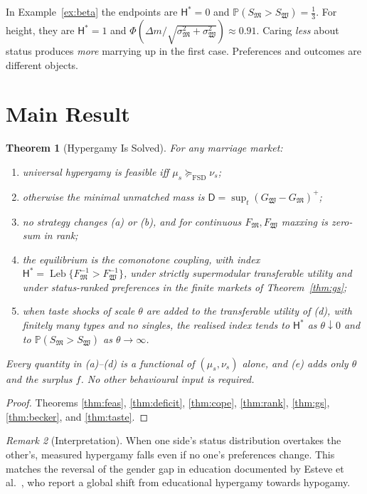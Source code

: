 \documentclass[11pt]{article}
\let\oldsection\section
\renewcommand{\section}{\Needspace{0.25\textheight}\oldsection}
\newtheorem{theorem}{Theorem}[section]
\theoremstyle{definition}
\theoremstyle{remark}
\newtheorem{remark}[theorem]{Remark}
\newcommand{\M}{\mathfrak{M}}
\newcommand{\W}{\mathfrak{W}}
\newcommand{\D}{\mathsf{D}}
\newcommand{\Hy}{\mathsf{H}}
\DeclareMathOperator{\Leb}{Leb}
\begin{document}
In Example~\ref{ex:beta} the endpoints are $\Hy^* = 0$ and
$\mathbb{P}(S_\M > S_\W) = \frac13$. For height, they are $\Hy^* = 1$
and $\Phi(\Delta m/\sqrt{\sigma_\M^2+\sigma_\W^2})\approx0.91$.
Caring \emph{less} about status produces \emph{more} marrying up in
the first case. Preferences and outcomes are different objects.

\section{Main Result}

\begin{theorem}[Hypergamy Is Solved]\label{thm:main}
  For any marriage market:
  \renewcommand{\labelenumi}{(\alph{enumi})}
  \begin{enumerate}
    \item universal hypergamy is feasible iff
      $\mu_s\succeq_{\mathrm{FSD}}\nu_s$;
    \item otherwise the minimal unmatched mass is $\D = \sup_t(G_\W - G_\M)^+$;
    \item no strategy changes (a) or (b), and for continuous
      $F_\M,F_\W$ maxxing is zero-sum in rank;
    \item the equilibrium is the comonotone coupling, with index
      ${\Hy^* = \Leb\{F_\M^{-1} > F_\W^{-1}\}}$, under strictly
      supermodular transferable utility and under status-ranked
      preferences in the finite markets of Theorem~\ref{thm:gs};
    \item when taste shocks of scale $\theta$ are added to the
      transferable utility of (d), with finitely many types and no
      singles, the realised index tends to $\Hy^*$ as
      $\theta\downarrow0$ and to $\mathbb{P}(S_\M > S_\W)$ as
      $\theta\to\infty$.
  \end{enumerate}
  Every quantity in (a)--(d) is a functional of $(\mu_s,\nu_s)$ alone,
  and (e) adds only $\theta$ and the surplus $f$. No other behavioural
  input is required.
\end{theorem}

\begin{proof}
  Theorems \ref{thm:feas}, \ref{thm:deficit}, \ref{thm:cope},
  \ref{thm:rank}, \ref{thm:gs}, \ref{thm:becker}, and \ref{thm:taste}.
\end{proof}

\begin{remark}[Interpretation]
  When one side's status distribution overtakes the other's, measured
  hypergamy falls even if no one's preferences change. This matches
  the reversal of the gender gap in education documented by Esteve et
  al.~\cite{esteve}, who report a global shift from educational
  hypergamy towards hypogamy.
\end{remark}
\end{document}
